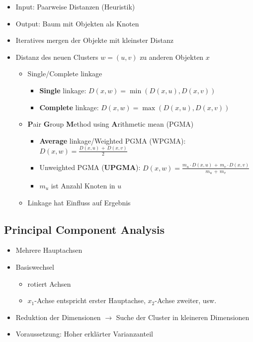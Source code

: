 \documentclass[nonacm=true, language=german]{acmart}
\begin{document}
\begin{itemize}
    \item Input: Paarweise Distanzen (Heuristik)
    \item Output: Baum mit Objekten als Knoten
    \item Iteratives mergen der Objekte mit kleinster Distanz
    \item Distanz des neuen Clusters $w = (u, v)$ zu anderen Objekten $x$
    \begin{itemize}
        \item Single/Complete linkage
        \begin{itemize}
            \item \textbf{Single} linkage: $ D(x,w) = \min(D(x,u), D(x,v)) $
            \item \textbf{Complete} linkage: $ D(x,w) = \max(D(x,u), D(x,v)) $
        \end{itemize}
        
        \item \textbf{P}air \textbf{G}roup \textbf{M}ethod using \textbf{A}rithmetic mean (PGMA)
        \begin{itemize}
            \item \textbf{Average} linkage/Weighted PGMA (WPGMA): $ D(x,w) = \frac{D(x,u) \, + \, D(x,v)}{2} $
            \item Unweighted PGMA (\textbf{UPGMA}): $ D(x,w) = \frac{m_u \cdot D(x,u) \, + \, m_v \cdot D(x,v)}{m_u \, + \, m_v} $
            \item $m_u$ ist Anzahl Knoten in $u$
        \end{itemize}
        
        \item Linkage hat Einfluss auf Ergebnis
    \end{itemize}
\end{itemize}

\subsection{Principal Component Analysis}

\begin{itemize}
    \item Mehrere Hauptachsen
    \item Basiswechsel
    \begin{itemize}
        \item rotiert Achsen
        \item $x_1$-Achse entspricht erster Hauptachse, $x_2$-Achse zweiter, usw.
    \end{itemize}
    
    \item Reduktion der Dimensionen $\rightarrow$ Suche der Cluster in kleineren Dimensionen
    \item Voraussetzung: Hoher erklärter Varianzanteil
\end{itemize}
\end{document}
